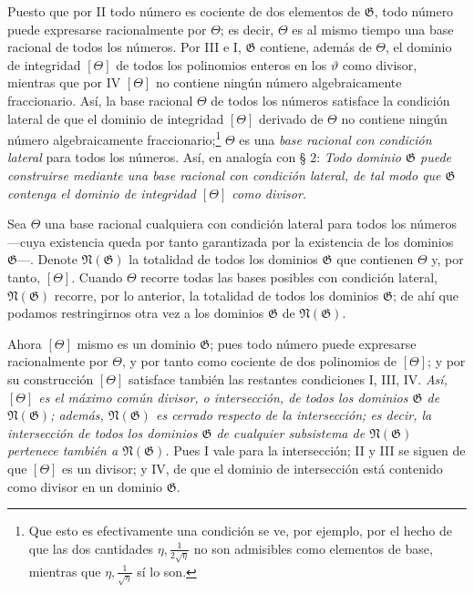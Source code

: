\documentclass[11pt]{article}
\begin{document}
Puesto que por II todo número es cociente de dos elementos de $\mathfrak G$, todo número puede expresarse racionalmente por $\Theta$; es decir, $\Theta$ es al mismo tiempo una base racional de todos los números. Por III e I, $\mathfrak G$ contiene, además de $\Theta$, el dominio de integridad $[\Theta]$ de todos los polinomios enteros en los $\vartheta$ como divisor, mientras que por IV $[\Theta]$ no contiene ningún número algebraicamente fraccionario. Así, la base racional $\Theta$ de todos los números satisface la condición lateral de que el dominio de integridad $[\Theta]$ derivado de $\Theta$ no contiene ningún número algebraicamente fraccionario;\footnote{Que esto es efectivamente una condición se ve, por ejemplo, por el hecho de que las dos cantidades $\eta,\frac1{2\sqrt{\eta}}$ no son admisibles como elementos de base, mientras que $\eta,\frac1{\sqrt{\eta}}$ sí lo son.} $\Theta$ es una \emph{base racional con condición lateral} para todos los números. Así, en analogía con § 2: \emph{Todo dominio $\mathfrak G$ puede construirse mediante una base racional con condición lateral, de tal modo que $\mathfrak G$ contenga el dominio de integridad $[\Theta]$ como divisor.}

Sea $\Theta$ una base racional cualquiera con condición lateral para todos los números ---cuya existencia queda por tanto garantizada por la existencia de los dominios $\mathfrak G$---. Denote $\mathfrak N(\mathfrak G)$ la totalidad de todos los dominios $\mathfrak G$ que contienen $\Theta$ y, por tanto, $[\Theta]$. Cuando $\Theta$ recorre todas las bases posibles con condición lateral, $\mathfrak N(\mathfrak G)$ recorre, por lo anterior, la totalidad de todos los dominios $\mathfrak G$; de ahí que podamos restringirnos otra vez a los dominios $\mathfrak G$ de $\mathfrak N(\mathfrak G)$.

Ahora $[\Theta]$ mismo es un dominio $\mathfrak G$; pues todo número puede expresarse racionalmente por $\Theta$, y por tanto como cociente de dos polinomios de $[\Theta]$; y por su construcción $[\Theta]$ satisface también las restantes condiciones I, III, IV. \emph{Así, $[\Theta]$ es el máximo común divisor, o intersección, de todos los dominios $\mathfrak G$ de $\mathfrak N(\mathfrak G)$; además, $\mathfrak N(\mathfrak G)$ es cerrado respecto de la intersección; es decir, la intersección de todos los dominios $\mathfrak G$ de cualquier subsistema de $\mathfrak N(\mathfrak G)$ pertenece también a $\mathfrak N(\mathfrak G)$.} Pues I vale para la intersección; II y III se siguen de que $[\Theta]$ es un divisor; y IV, de que el dominio de intersección está contenido como divisor en un dominio $\mathfrak G$.
\end{document}
